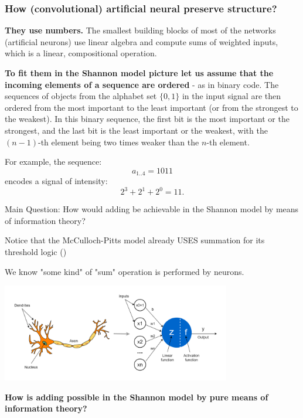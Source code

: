 \documentclass[10pt, aspectratio=169, handout]{beamer}
\begin{document}
\begin{frame}[label=cnn_structure]
    \frametitle{How (convolutional) artificial neural preserve structure?}
    \textbf{They use numbers.}
    The smallest building blocks of most of the  networks (artificial neurons) use  linear algebra and compute sums of weighted inputs, which is a linear, compositional  operation.    
    
    \textbf{To fit them in the Shannon model picture let us assume that the incoming elements of a sequence are ordered} - as in binary code.  The sequences of objects from the alphabet set \(\{0,1\}\) in the input signal are then ordered from the most important to the least important (or from the strongest to the weakest). In this binary sequence, the first bit is the most important or the strongest, and the last bit is the least important or the weakest, with the \((n-1)\)-th element being two times weaker than the \(n\)-th element. 

For example, the sequence:
\[
a_{1..4} = 1011
\]
encodes a signal of intensity:
\[
2^3 + 2^1 + 2^0 = 11.
\]
    

\end{frame}




\begin{frame}{Main Question: How would adding be achievable in the Shannon model by means of information theory?}


    Notice that the McCulloch-Pitts  model already USES summation for its threshold logic (\cite{mcculloch_logical_1943})
   
     We know "some kind" of "sum" operation is performed by neurons.
     
     \includegraphics[width=10cm]{images/latexImage_63d4c13d6261c28a5b1ff9f3f41e4f0d.png}

  \textbf{ How is adding possible in the Shannon model by pure means of information theory?}
    
\end{frame}
 
\end{document}
